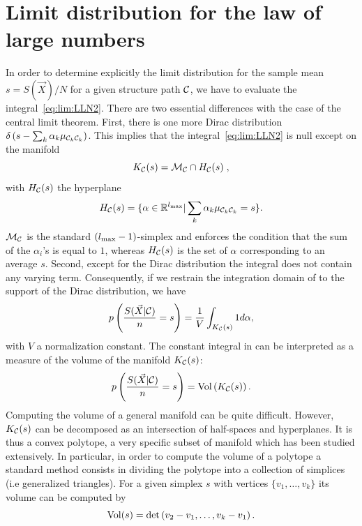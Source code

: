 \documentclass{article}
\begin{document}
\section{Limit distribution for the law of large numbers} \label{sec:geom}
In order to determine explicitly the limit distribution for the sample mean $s=S(\vec X)/N$ for a given structure path $\mathcal C $, we have to evaluate 
the integral~\eqref{eq:lim:LLN2}. There are two essential differences with the case of the central limit theorem. 
First, there is one more Dirac distribution
$\delta \left( s - \sum _k \alpha _k  \mu _{\mathcal C_k \mathcal C_k} \right)$. This implies that the integral~\eqref{eq:lim:LLN2} is null except on the manifold
\begin{equation}
K_{\mathcal C }(s) = \mathcal M_{\mathcal C } \cap H_{\mathcal C }(s) \;,
\end{equation}
with $H_{\mathcal C }(s)$ the hyperplane
\begin{align}
H_{\mathcal C }(s) = \{ \alpha  \in  \mathbb R ^{{l_{\max}}} | \sum _k \alpha _k \mu _{\mathcal C _k \mathcal C _k} = s \}.
\end{align}
$\mathcal M_{\mathcal C }$ is the standard $({l_{\max}}-1)$-simplex and enforces the condition that 
the sum of the $\alpha _i$'s is equal to $1$, whereas $H_\mathcal C (s)$ is the set of $\alpha $ corresponding to an average $s$.
Second, except for the Dirac distribution the integral does not contain any varying term.
Consequently, if we restrain the integration domain of  to the support of the Dirac distribution, we have
\begin{equation} \label{eq:pregeom}
 p \left( \frac{S(\vec X | \mathcal C )}{n} = s \right)  = \frac{1}{V}\int_{K_\mathcal C (s)} 1 d\alpha ,
\end{equation}
with $V$ a normalization constant.
The constant integral in  can be interpreted as a measure of the 
volume of the manifold $K_\mathcal C (s)$:
 \begin{equation} \label{eq:lln:geom}
 p \left( \frac{S(\vec X | \mathcal C )}{n} = s \right) = \mathrm{Vol} \left(K_\mathcal C (s)\right).
\end{equation}
Computing the volume of a general manifold can be quite difficult. However, $K_\mathcal C (s)$
can be decomposed as an intersection of half-spaces and hyperplanes. It is thus a convex polytope,
a very specific subset of manifold which has been studied extensively. In particular, in order 
to compute the volume of a polytope a standard method consists in dividing the polytope into
a collection of simplices (i.e generalized triangles). For a given simplex $s$ with vertices $\{ v_1, \dots, v_k \}$ its volume can be computed by 
\begin{equation}
\mathrm{Vol}(s) = \det\left(v_2-v_1, \dots, v_k - v_1\right).
\end{equation}
\end{document}
